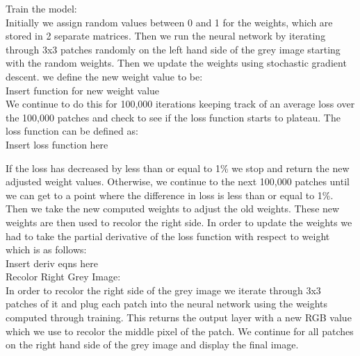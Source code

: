 \documentclass{article}
\theoremstyle{definition}
\begin{document}
        Train the model: \\
        Initially we assign random values between 0 and 1 for the weights, which are stored in 2 separate matrices. Then we run the neural network by iterating through 3x3 patches randomly on the left hand side of the grey image starting with the random weights. Then we update the weights using stochastic gradient descent. we define the new weight value to be: \\
        
        Insert function for new weight value \\
        
        We continue to do this for 100,000 iterations keeping track of an average loss over the 100,000 patches and check to see if the loss function starts to plateau. The loss function can be defined as:\\
        
        Insert loss function here \\
        \begin{figure}[H]
            \centering
        \end{figure}
        
        If the loss has decreased by less than or equal to 1\% we stop and return the new adjusted weight values. Otherwise, we continue to the next 100,000 patches until we can get to a point where the difference in loss is less than or equal to 1\%. Then we take the new computed weights to adjust the old weights. These new weights are then used to recolor the right side. In order to update the weights we had to take the partial derivative of the loss function with respect to weight which is as follows:\\
        
        Insert deriv eqns here\\
        
        Recolor Right Grey Image: \\
        In order to recolor the right side of the grey image we iterate through 3x3 patches of it and plug each patch into the neural network using the weights computed through training. This returns the output layer with a new RGB value which we use to recolor the middle pixel of the patch. We continue for all patches on the right hand side of the grey image and display the final image. \\
        
\end{document}
